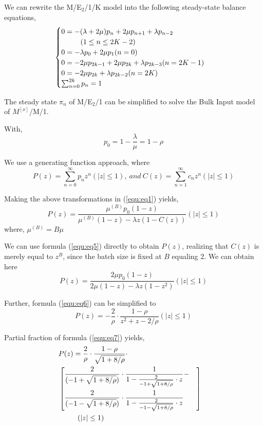 \documentclass[10pt,journal,letterpaper,compsoc]{IEEEtran}
\begin{document}
We can rewrite the M/E$_2$/1/K model into the following
steady-state balance equations,
\begin{eqnarray}
\label{equ:eq2}
  \begin{cases}
    0=-(\lambda+2\mu)p_n+2\mu p_{n+1}+\lambda p_{n-2}\cr
            ~~~~~~~~(1\leq n\leq 2K-2) \cr
    0=-\lambda p_0+2\mu p_1 (n=0) \cr
    0=-2\mu p_{2k-1}+2\mu p_{2k}+\lambda p_{2k-3}(n=2K-1) \cr
    0=-2\mu p_{2k}+\lambda p_{2k-2}(n=2K) \cr
    \sum_{n=0}^{2k}p_n=1
  \end{cases}
\end{eqnarray}

The steady state $\pi_n$ of M/E$_2$/1 can be simplified to
solve the Bulk Input model of $M^{[x]}$/M/1.

With,
\begin{equation}
\label{equ:eq3}
p_0=1-\frac{\lambda}{\mu}=1-\rho
\end{equation}

We use a generating function approach, where
\begin{equation}
\label{equ:eq4}
P(z)=\sum_{n=0}^{\infty} p_nz^n(\left\vert z\right\vert\leq 1),~and~C(z)=\sum_{n=1}^{\infty} c_nz^n(\left\vert z\right\vert\leq 1)
\end{equation}

Making the above transformations in (\ref{equ:eq1}) yields,
\begin{equation}
\label{equ:eq5}
P(z)=\frac{\mu^{(B)}p_0(1-z)}{\mu^{(B)}(1-z)-\lambda z(1-C(z))}(\left\vert z\right\vert\leq 1)
\end{equation}
where, $\mu^{(B)}=B\mu$

We can use formula (\ref{equ:eq5}) directly to obtain $P(z)$,
realizing that $C(z)$ is merely equal to $z^B$,
since the batch size is fixed at $B$ equaling 2.
We can obtain here
\begin{equation}
\label{equ:eq6}
P(z)=\frac{2\mu p_0(1-z)}{2\mu(1-z)-\lambda z(1-z^2)}(\left\vert z\right\vert\leq 1)
\end{equation}

Further, formula (\ref{equ:eq6}) can be simplified to
\begin{equation}
\label{equ:eq7}
P(z)=-\frac{2}{\rho}\cdot\frac{1-\rho}{z^2+z-2/\rho}(\left\vert z\right\vert\leq 1)
\end{equation}

Partial fraction of formula (\ref{equ:eq7}) yields,
\begin{eqnarray}
\label{equ:eq8}
  \begin{aligned}
  &P(z)=\frac{2}{\rho}\cdot \frac{1-\rho}{\sqrt{1+8/\rho}}\cdot \cr
  &\left[
    \begin{aligned}
      &\frac{2}{(-1+\sqrt{1+8/\rho})}\cdot\frac{1}{1-\frac{2}{-1+\sqrt{1+8/\rho}}\cdot z}-\cr
      &\frac{2}{(-1-\sqrt{1+8/\rho})}\cdot\frac{1}{1-\frac{2}{-1-\sqrt{1+8/\rho}}\cdot z}
    \end{aligned}
  \right] \cr
  &~~~~~~~~(\left\vert z\right\vert\leq 1)
  \end{aligned}
\end{eqnarray}
\end{document}
